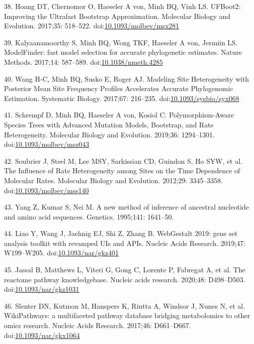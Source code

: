 \documentclass[]{elsarticle} %
\begin{document}
\leavevmode\hypertarget{ref-UFBoot2}{}%
38. Hoang DT, Chernomor O, Haeseler A von, Minh BQ, Vinh LS. UFBoot2: Improving the Ultrafast Bootstrap Approximation. Molecular Biology and Evolution. 2017;35: 518--522. doi:\href{https://doi.org/10.1093/molbev/msx281}{10.1093/molbev/msx281}

\leavevmode\hypertarget{ref-ModelFinder}{}%
39. Kalyaanamoorthy S, Minh BQ, Wong TKF, Haeseler A von, Jermiin LS. ModelFinder: fast model selection for accurate phylogenetic estimates. Nature Methods. 2017;14: 587--589. doi:\href{https://doi.org/10.1038/nmeth.4285}{10.1038/nmeth.4285}

\leavevmode\hypertarget{ref-PMSF}{}%
40. Wang H-C, Minh BQ, Susko E, Roger AJ. Modeling Site Heterogeneity with Posterior Mean Site Frequency Profiles Accelerates Accurate Phylogenomic Estimation. Systematic Biology. 2017;67: 216--235. doi:\href{https://doi.org/10.1093/sysbio/syx068}{10.1093/sysbio/syx068}

\leavevmode\hypertarget{ref-Schrempf2019}{}%
41. Schrempf D, Minh BQ, Haeseler A von, Kosiol C. Polymorphism-Aware Species Trees with Advanced Mutation Models, Bootstrap, and Rate Heterogeneity. Molecular Biology and Evolution. 2019;36: 1294--1301. doi:\href{https://doi.org/10.1093/molbev/msz043}{10.1093/molbev/msz043}

\leavevmode\hypertarget{ref-Soubrier2012}{}%
42. Soubrier J, Steel M, Lee MSY, Sarkissian CD, Guindon S, Ho SYW, et al. The Influence of Rate Heterogeneity among Sites on the Time Dependence of Molecular Rates. Molecular Biology and Evolution. 2012;29: 3345--3358. doi:\href{https://doi.org/10.1093/molbev/mss140}{10.1093/molbev/mss140}

\leavevmode\hypertarget{ref-Yang1995}{}%
43. Yang Z, Kumar S, Nei M. A new method of inference of ancestral nucleotide and amino acid sequences. Genetics. 1995;141: 1641--50.

\leavevmode\hypertarget{ref-WebGestalt2019}{}%
44. Liao Y, Wang J, Jaehnig EJ, Shi Z, Zhang B. WebGestalt 2019: gene set analysis toolkit with revamped UIs and APIs. Nucleic Acids Research. 2019;47: W199--W205. doi:\href{https://doi.org/10.1093/nar/gkz401}{10.1093/nar/gkz401}

\leavevmode\hypertarget{ref-Reactome}{}%
45. Jassal B, Matthews L, Viteri G, Gong C, Lorente P, Fabregat A, et al. The reactome pathway knowledgebase. Nucleic acids research. 2020;48: D498--D503. doi:\href{https://doi.org/10.1093/nar/gkz1031}{10.1093/nar/gkz1031}

\leavevmode\hypertarget{ref-Wikipathways}{}%
46. Slenter DN, Kutmon M, Hanspers K, Riutta A, Windsor J, Nunes N, et al. WikiPathways: a multifaceted pathway database bridging metabolomics to other omics research. Nucleic Acids Research. 2017;46: D661--D667. doi:\href{https://doi.org/10.1093/nar/gkx1064}{10.1093/nar/gkx1064}
\end{document}
